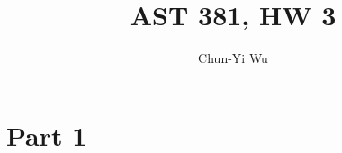 \documentclass[10pt,letterpaper]{report}
\author{Chun-Yi Wu}
\title{AST 381, HW 3}
\begin{document}
\chapter*{Part 1}
\end{document}
